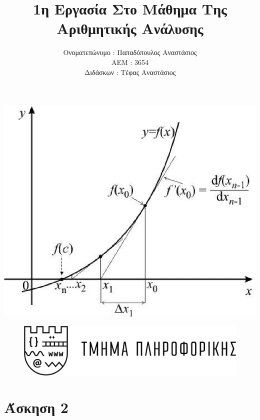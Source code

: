 \documentclass{article}
\title{1η Εργασία Στο Μάθημα Της Αριθμητικής Ανάλυσης}
\author{ Ονοματεπώνυμο : Παπαδόπουλος Αναστάσιος \\
            ΑΕΜ : 3654 \\
            Διδάσκων : Τέφας Αναστάσιος }
\begin{document}
\normalsize
\maketitle
\vspace{15px}
\begin{center}
    \includegraphics[scale=0.25]{intro_page_logo.png}
\end{center}
\begin{figure}[b]
    \begin{center}
        \includegraphics[scale=0.15]{csd_logo.png}    
    \end{center}
\end{figure}
\newpage
\doublespacing
\tableofcontents
\newpage









\section{ Άσκηση 2 }
\end{document}
